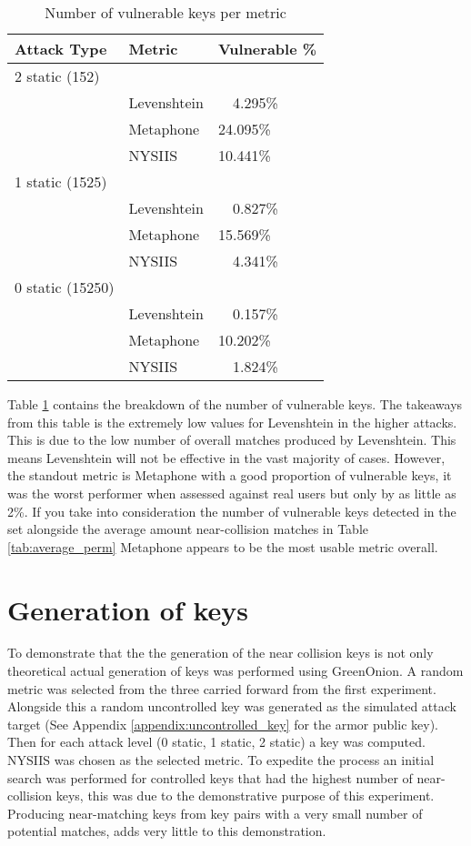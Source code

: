 
\begin{table}[!h]
    \centering
    \begin{tabular}{|lll|}
        \hline
        \textbf{Attack Type} & \textbf{Metric} & \textbf{Vulnerable \%} \\
        \hline 
        2 static (152) && \\ 
        & Levenshtein & ~~4.295\% \\
        & Metaphone & 24.095\% \\
        & NYSIIS & 10.441\% \\
        \hline
        1 static (1525) && \\ 
        & Levenshtein & ~~0.827\% \\
        & Metaphone & 15.569\% \\
        & NYSIIS & ~~4.341\% \\
        \hline
        0 static (15250) && \\ 
        & Levenshtein & ~~0.157\% \\
        & Metaphone & 10.202\% \\
        & NYSIIS & ~~1.824\% \\
        \hline
    \end{tabular}
    \caption{Number of vulnerable keys per metric}
    \label{tab:vulnkeys}
\end{table}

Table \ref{tab:vulnkeys} contains the breakdown of the number of vulnerable keys. The takeaways from this table is the extremely low values for Levenshtein in the higher attacks. This is due to the low number of overall matches produced by Levenshtein. This means Levenshtein will not be effective in the vast majority of cases. However, the standout metric is Metaphone with a good proportion of vulnerable keys, it was the worst performer when assessed against real users but only by as little as 2\%. If you take into consideration the number of vulnerable keys detected in the set alongside the average amount near-collision matches in Table \ref{tab:average_perm} Metaphone appears to be the most usable metric overall.

\section{Generation of keys}
To demonstrate that the the generation of the near collision keys is not only theoretical actual generation of keys was performed using GreenOnion. A random metric was selected from the three carried forward from the first experiment. Alongside this a random uncontrolled key was generated as the simulated attack target (See Appendix \ref{appendix:uncontrolled_key} for the armor public key). Then for each attack level (0 static, 1 static, 2 static) a key was computed. NYSIIS was chosen as the selected metric. To expedite the process an initial search was performed for controlled keys that had the highest number of near-collision keys, this was due to the demonstrative purpose of this experiment. Producing near-matching keys from key pairs with a very small number of potential matches, adds very little to this demonstration.

